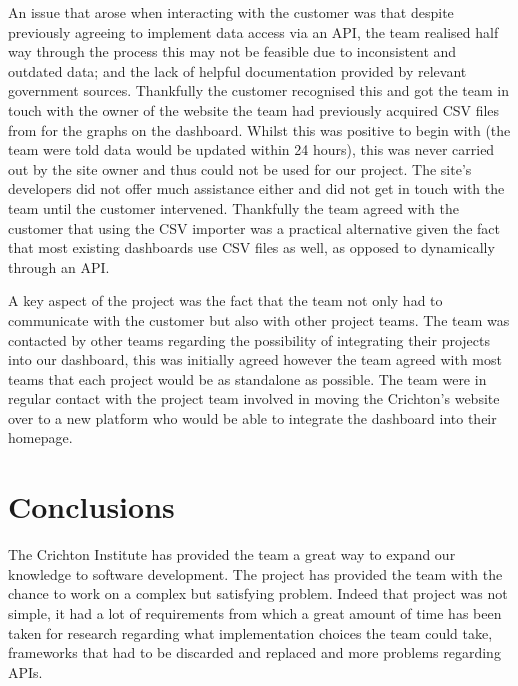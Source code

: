 \documentclass{l3proj}
\begin{document}
An issue that arose when interacting with the customer was that despite previously agreeing to implement data access via an API, the team realised half way through the process this may not be feasible due to inconsistent and outdated data; and the lack of helpful documentation provided by relevant government sources. Thankfully the customer recognised this and got the team in touch with the owner of the website the team had previously acquired CSV files from for the graphs on the dashboard. Whilst this was positive to begin with (the team were told data would be updated within 24 hours), this was never carried out by the site owner and thus could not be used for our project. The site's developers did not offer much assistance either and did not get in touch with the team until the customer intervened. Thankfully the team agreed with the customer that using the CSV importer was a practical alternative given the fact that most existing dashboards use CSV files as well, as opposed to dynamically through an API.

A key aspect of the project was the fact that the team not only had to communicate with the customer but also with other project teams. The team was contacted by other teams regarding the possibility of integrating their projects into our dashboard, this was initially agreed however the team agreed with most teams that each project would be as standalone as possible. The team were in regular contact with the project team involved in moving the Crichton's website over to a new platform who would be able to integrate the dashboard into their homepage.

\section{Conclusions}
\label{sec:conclusions}


The Crichton Institute has provided the team a great way to expand our knowledge to software development. The project has provided the team with the chance to work on a complex but satisfying problem. Indeed that project was not simple, it had a lot of requirements from which a great amount of time has been taken for research regarding what implementation choices the team could take, frameworks that had to be discarded and replaced and more problems regarding APIs.
\end{document}
